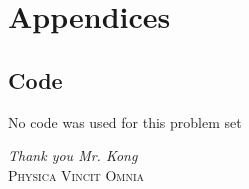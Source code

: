 \documentclass[12pt,a4paper]{article}
\begin{document}
	 
	 
	\section*{Appendices}
		\label{appendix}
	
		\subsection*{Code} 
		No code was used for this problem set
	\vfill
	\begin{center}
		\textit{Thank you Mr. Kong}\\
		\vspace{1cm}
		{\large
		\textsc{Physica Vincit Omnia}
		}
	\end{center}
\end{document}

